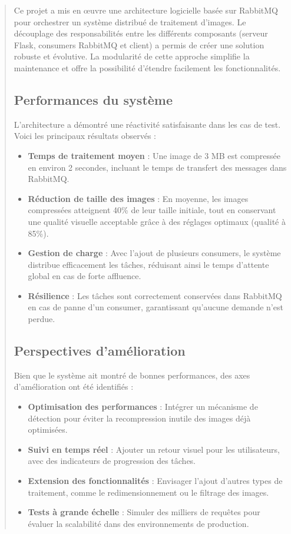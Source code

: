 \documentclass[12pt]{article}
\begin{document}
\begin{quote}
    
Ce projet a mis en œuvre une architecture logicielle basée sur RabbitMQ pour orchestrer un système distribué de traitement d'images. Le découplage des responsabilités entre les différents composants (serveur Flask, consumers RabbitMQ et client) a permis de créer une solution robuste et évolutive. La modularité de cette approche simplifie la maintenance et offre la possibilité d'étendre facilement les fonctionnalités.

\subsection{Performances du système}
L'architecture a démontré une réactivité satisfaisante dans les cas de test. Voici les principaux résultats observés : \\

\begin{itemize}
    \item \textbf{Temps de traitement moyen} : Une image de 3 MB est compressée en environ 2 secondes, incluant le temps de transfert des messages dans RabbitMQ.
    \item \textbf{Réduction de taille des images} : En moyenne, les images compressées atteignent 40\% de leur taille initiale, tout en conservant une qualité visuelle acceptable grâce à des réglages optimaux (qualité à 85\%).
    \item \textbf{Gestion de charge} : Avec l'ajout de plusieurs consumers, le système distribue efficacement les tâches, réduisant ainsi le temps d'attente global en cas de forte affluence.
    \item \textbf{Résilience} : Les tâches sont correctement conservées dans RabbitMQ en cas de panne d'un consumer, garantissant qu'aucune demande n'est perdue.
\end{itemize}

\subsection{Perspectives d'amélioration}
Bien que le système ait montré de bonnes performances, des axes d'amélioration ont été identifiés : \\

\begin{itemize}
    \item \textbf{Optimisation des performances} : Intégrer un mécanisme de détection pour éviter la recompression inutile des images déjà optimisées.
    \item \textbf{Suivi en temps réel} : Ajouter un retour visuel pour les utilisateurs, avec des indicateurs de progression des tâches.
    \item \textbf{Extension des fonctionnalités} : Envisager l'ajout d'autres types de traitement, comme le redimensionnement ou le filtrage des images.
    \item \textbf{Tests à grande échelle} : Simuler des milliers de requêtes pour évaluer la scalabilité dans des environnements de production.
\end{itemize}


\end{quote}
\end{document}
